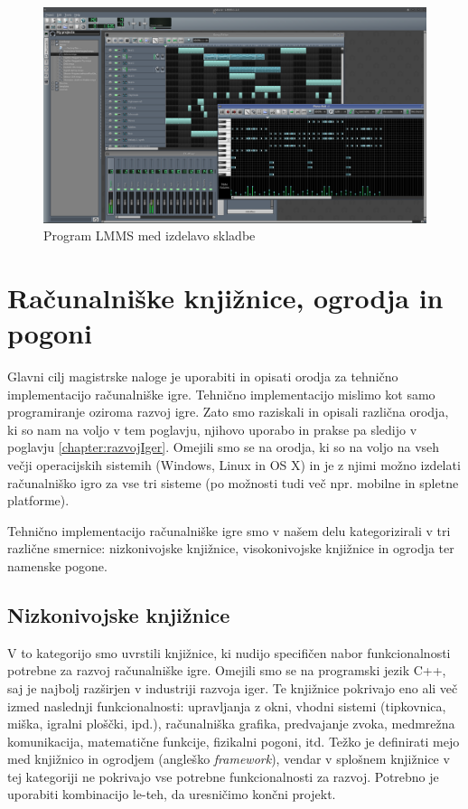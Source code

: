 \documentclass[12pt,a4paper,twoside]{book}
\begin{document}
\begin{figure}[h]
	\centering
	\includegraphics[width=12cm]{lmms}
	\caption{Program LMMS med izdelavo skladbe}
	\label{slika:lmms}
\end{figure}

\section{Računalniške knjižnice, ogrodja in pogoni}
Glavni cilj magistrske naloge je uporabiti in opisati orodja za tehnično implementacijo računalniške igre. Tehnično implementacijo mislimo kot samo programiranje oziroma razvoj igre. Zato smo raziskali in opisali različna orodja, ki so nam na voljo v tem poglavju, njihovo uporabo in prakse pa sledijo v poglavju \ref{chapter:razvojIger}. Omejili smo se na orodja, ki so na voljo na vseh večji operacijskih sistemih (Windows, Linux in OS X) in je z njimi možno izdelati računalniško igro za vse tri sisteme (po možnosti tudi več npr. mobilne in spletne platforme).

Tehnično implementacijo računalniške igre smo v našem delu kategorizirali v tri različne smernice: nizkonivojske knjižnice, visokonivojske knjižnice in ogrodja ter namenske pogone.

\subsection{Nizkonivojske knjižnice}
V to kategorijo smo uvrstili knjižnice, ki nudijo specifičen nabor funkcionalnosti potrebne za razvoj računalniške igre. Omejili smo se na programski jezik C++, saj je najbolj razširjen v industriji razvoja iger. Te knjižnice pokrivajo eno ali več izmed naslednji funkcionalnosti: upravljanja z okni, vhodni sistemi (tipkovnica, miška, igralni ploščki, ipd.), računalniška grafika, predvajanje zvoka, medmrežna komunikacija, matematične funkcije, fizikalni pogoni, itd. Težko je definirati mejo med knjižnico in ogrodjem (angleško \textit{framework}), vendar v splošnem knjižnice v tej kategoriji ne pokrivajo vse potrebne funkcionalnosti za razvoj. Potrebno je uporabiti kombinacijo le-teh, da uresničimo končni projekt.
\end{document}
